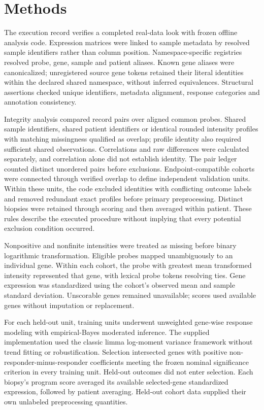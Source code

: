 \documentclass[10pt,a4paper]{article}
\begin{document}
\section*{Methods}
The execution record verifies a completed real-data look with frozen offline analysis code. Expression matrices were linked to sample metadata by resolved sample identifiers rather than column position. Namespace-specific registries resolved probe, gene, sample and patient aliases. Known gene aliases were canonicalized; unregistered source gene tokens retained their literal identities within the declared shared namespace, without inferred equivalences. Structural assertions checked unique identifiers, metadata alignment, response categories and annotation consistency.
\par
Integrity analysis compared record pairs over aligned common probes. Shared sample identifiers, shared patient identifiers or identical rounded intensity profiles with matching missingness qualified as overlap; profile identity also required sufficient shared observations. Correlations and raw differences were calculated separately, and correlation alone did not establish identity. The pair ledger counted distinct unordered pairs before exclusions. Endpoint-compatible cohorts were connected through verified overlap to define independent validation units. Within these units, the code excluded identities with conflicting outcome labels and removed redundant exact profiles before primary preprocessing. Distinct biopsies were retained through scoring and then averaged within patient. These rules describe the executed procedure without implying that every potential exclusion condition occurred.
\par
Nonpositive and nonfinite intensities were treated as missing before binary logarithmic transformation. Eligible probes mapped unambiguously to an individual gene. Within each cohort, the probe with greatest mean transformed intensity represented that gene, with lexical probe tokens resolving ties. Gene expression was standardized using the cohort's observed mean and sample standard deviation. Unscorable genes remained unavailable; scores used available genes without imputation or replacement.
\par
For each held-out unit, training units underwent unweighted gene-wise response modeling with empirical-Bayes moderated inference. The supplied implementation used the classic limma log-moment variance framework without trend fitting or robustification. Selection intersected genes with positive non-responder-minus-responder coefficients meeting the frozen nominal significance criterion in every training unit. Held-out outcomes did not enter selection. Each biopsy's program score averaged its available selected-gene standardized expression, followed by patient averaging. Held-out cohort data supplied their own unlabeled preprocessing quantities.
\end{document}
